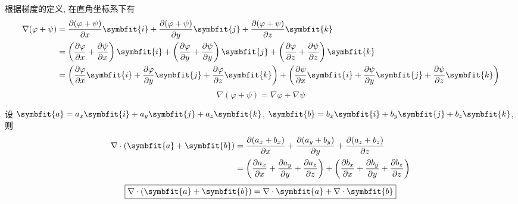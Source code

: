 \begin{myproof}

    根据梯度的定义, 在直角坐标系下有
    \begin{equation}
        \begin{aligned}
            \nabla (\varphi + \psi) & = \frac{\partial (\varphi + \psi)}{\partial x} \symbfit{i} + \frac{\partial (\varphi + \psi)}{\partial y} \symbfit{j} + \frac{\partial (\varphi + \psi)}{\partial z} \symbfit{k}                                                                                                                                                 \\
                                    & = \left( \frac{\partial \varphi}{\partial x} + \frac{\partial \psi}{\partial x} \right) \symbfit{i} + \left( \frac{\partial \varphi}{\partial y} + \frac{\partial \psi}{\partial y} \right) \symbfit{j} + \left( \frac{\partial \varphi}{\partial z} + \frac{\partial \psi}{\partial z} \right) \symbfit{k}                      \\
                                    & = \left( \frac{\partial \varphi}{\partial x} \symbfit{i} + \frac{\partial \varphi}{\partial y} \symbfit{j} + \frac{\partial \varphi}{\partial z} \symbfit{k} \right) + \left( \frac{\partial \psi}{\partial x} \symbfit{i} + \frac{\partial \psi}{\partial y} \symbfit{j} + \frac{\partial \psi}{\partial z} \symbfit{k} \right)
        \end{aligned}
    \end{equation}
    \begin{equation}
        \boxed{\nabla(\varphi + \psi) = \nabla \varphi + \nabla \psi}
    \end{equation}


    设 $\symbfit{a} = a_x \symbfit{i} + a_y \symbfit{j} + a_z \symbfit{k}$, $\symbfit{b} = b_x \symbfit{i} + b_y \symbfit{j} + b_z \symbfit{k}$, 则
    \begin{equation}
        \begin{aligned}
            \nabla \cdot (\symbfit{a} + \symbfit{b}) & = \frac{\partial (a_x + b_x)}{\partial x} + \frac{\partial (a_y + b_y)}{\partial y} + \frac{\partial (a_z + b_z)}{\partial z}                                                                                                             \\
                                                     & = \left( \frac{\partial a_x}{\partial x} + \frac{\partial a_y}{\partial y} + \frac{\partial a_z}{\partial z} \right) + \left( \frac{\partial b_x}{\partial x} + \frac{\partial b_y}{\partial y} + \frac{\partial b_z}{\partial z} \right)
        \end{aligned}
    \end{equation}
    \begin{equation}
        \boxed{\nabla \cdot (\symbfit{a} + \symbfit{b}) = \nabla \cdot \symbfit{a} + \nabla \cdot \symbfit{b}}
    \end{equation}


\end{myproof}
